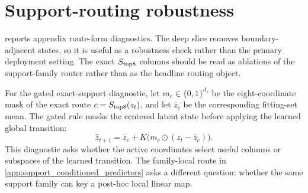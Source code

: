 \section{Support-routing robustness}
\label{app:routing_robustness}

 reports appendix route-form diagnostics. The deep slice removes boundary-adjacent states, so it is useful as a robustness check rather than the primary deployment setting. The exact \(S_{\rm top8}\) columns should be read as ablations of the support-family router rather than as the headline routing object.

For the gated exact-support diagnostic, let \(m_c\in\{0,1\}^{d_z}\) be the eight-coordinate mask of the exact route \(c=S_{\rm top8}(z_t)\), and let \(\bar z_c\) be the corresponding fitting-set mean. The gated rule masks the centered latent state before applying the learned global transition:
\begin{equation}
  \hat z_{t+1}=\bar z_c+K\bigl(m_c\odot (z_t-\bar z_c)\bigr).
  \label{eq:gated_k}
\end{equation}
This diagnostic asks whether the active coordinates select useful columns or subspaces of the learned transition. The family-local route in \cref{app:support_conditioned_predictors} asks a different question: whether the same support family can key a post-hoc local linear map.

